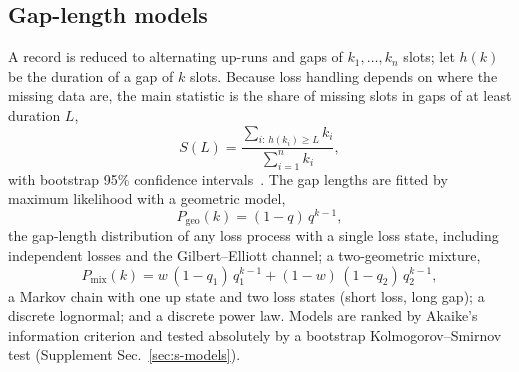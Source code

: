 \subsection{Gap-length models}
\label{sec:data-outages}
A record is reduced to alternating up-runs and gaps of $k_1,\dots,k_n$ slots; let $h(k)$ be the duration of a gap of $k$ slots. Because loss handling depends on where the missing data are, the main statistic is the share of missing slots in gaps of at least duration $L$,
\begin{equation}
S(L)=\frac{\sum_{i:\,h(k_i)\ge L} k_i}{\sum_{i=1}^{n} k_i},
\label{eq:share}
\end{equation}
with bootstrap 95\% confidence intervals~\cite{efron1979bootstrap}. The gap lengths are fitted by maximum likelihood with a geometric model,
\begin{equation}
P_\mathrm{geo}(k)=(1-q)\,q^{k-1},
\label{eq:geo}
\end{equation}
the gap-length distribution of any loss process with a single loss state, including independent losses and the Gilbert--Elliott channel; a two-geometric mixture,
\begin{equation}
P_\mathrm{mix}(k)=w\,(1-q_1)\,q_1^{k-1}+(1-w)\,(1-q_2)\,q_2^{k-1},
\label{eq:mix}
\end{equation}
a Markov chain with one up state and two loss states (short loss, long gap); a discrete lognormal; and a discrete power law. Models are ranked by Akaike's information criterion and tested absolutely by a bootstrap Kolmogorov--Smirnov test (Supplement Sec.~\ref{sec:s-models}).

